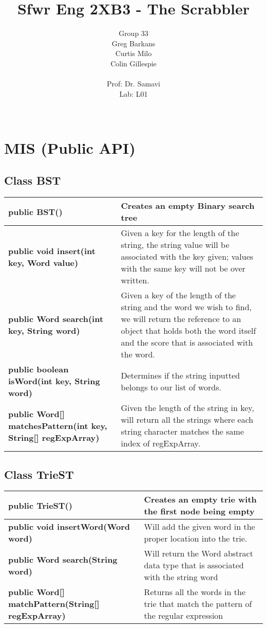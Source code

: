 \documentclass[11pt]{article}
\title{\vspace{4cm} 
	 Sfwr Eng 2XB3 - The Scrabbler}      %
\author{ 
	Group 33 \\       %
	Greg Barkans \\
	Curtis Milo \\
	Colin Gillespie \\
	 \vspace{1cm} \\
	Prof: Dr. Samavi \\
	Lab: L01 \\
	 \vspace{2cm} \\
}
\date{}
\begin{document}
\maketitle
\newpage
\tableofcontents
\newpage

\section{MIS (Public API)}

\subsection{Class BST}

\begin{tabular}{|p{}|p{}|}
\hline
\textbf{public BST()} & Creates an empty Binary search tree \\
\hline
\textbf{public void insert(int key, Word value)} & Given a key for the length of the string,  the string value will be associated with the key given;  values with the same key will not be over written.\\
\hline
\textbf{public Word search(int key, String word)} & Given a key of the length of the string and the word we wish to find, we will return the reference to an object that holds both the word itself and the score that is associated with the word.\\
\hline
\textbf{public  boolean isWord(int key, String word)} & Determines if the string inputted belongs to our list of words.\\
\hline
\textbf{public Word[] matchesPattern(int key, String[] regExpArray)} & Given the length of the string in key, will return all the strings where each string character matches the same index of regExpArray.\\
\hline
\end{tabular}


\subsection{Class TrieST}

\begin{tabular}{|p{}|p{}|}
\hline
\textbf{public TrieST()} & Creates an empty trie with the first node being empty\\
\hline
\textbf{public void insertWord(Word word)} & Will add the given word in the proper location into the trie. \\
\hline
\textbf{public Word search(String word)} & Will return the Word abstract data type that is associated with the string word\\
\hline
\textbf{public Word[] matchPattern(String[] regExpArray)} & Returns all the words in the trie that match the pattern of the regular expression\\
\hline
\end{tabular}
\end{document}
